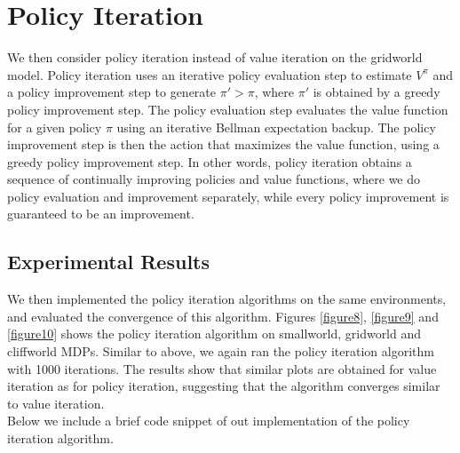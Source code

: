 \documentclass{article}\usepackage[]{graphicx}\usepackage[]{color}
\let\Oldsection\section
\renewcommand{\section}{\FloatBarrier\Oldsection}
\let\Oldsubsection\subsection
\renewcommand{\subsection}{\FloatBarrier\Oldsubsection}
\theoremstyle{plain}
\begin{document}
\section{Policy Iteration}

\noindent
We then consider policy iteration instead of value iteration on the gridworld model. Policy iteration uses an iterative policy evaluation step to estimate $V^{\pi}$ and a policy improvement step to generate $\pi' > \pi$, where $\pi'$ is obtained by a greedy policy improvement step. The policy evaluation step evaluates the value function for a given policy $\pi$ using an iterative Bellman expectation backup. The policy improvement step is then the action that maximizes the value function, using a greedy policy improvement step. In other words, policy iteration obtains a sequence of continually improving policies and value functions, where we do policy evaluation and improvement separately, while every policy improvement is guaranteed to be an improvement. 




\subsection{Experimental Results}

\noindent
We then implemented the policy iteration algorithms on the same environments, and evaluated the convergence of this algorithm. Figures \ref{figure8}, \ref{figure9} and \ref{figure10} shows the policy iteration algorithm on smallworld, gridworld and cliffworld MDPs. Similar to above, we again ran the policy iteration algorithm with 1000 iterations. The results show that similar plots are obtained for value iteration as for policy iteration, suggesting that the algorithm converges similar to value iteration.\\


\noindent
Below we include a brief code snippet of out implementation of the policy iteration algorithm.
\end{document}
